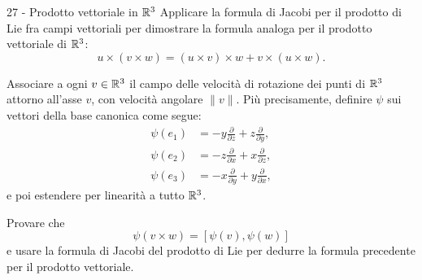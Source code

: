 \documentclass[a4paper]{article}
\begin{document}
\begin{snippetexercise}{27 - Prodotto vettoriale in \(\mathbb{R}^3\)}
    Applicare la formula di Jacobi per il prodotto di Lie fra campi
    vettoriali per dimostrare la formula analoga per il prodotto
    vettoriale di \(\mathbb{R}^3\):
    \[
        u\times(v\times w)
        =
        (u\times v)\times w+v\times(u\times w).
    \]

    Associare a ogni \(v\in\mathbb{R}^3\) il campo delle velocità di
    rotazione dei punti di \(\mathbb{R}^3\) attorno all'asse \(v\),
    con velocità angolare \(\|v\|\). Più precisamente, definire
    \(\psi\) sui vettori della base canonica come segue:
    \begin{align*}
        \psi(e_1)
        &=
        -y\frac{\partial}{\partial z}
        +z\frac{\partial}{\partial y},\\
        \psi(e_2)
        &=
        -z\frac{\partial}{\partial x}
        +x\frac{\partial}{\partial z},\\
        \psi(e_3)
        &=
        -x\frac{\partial}{\partial y}
        +y\frac{\partial}{\partial x},
    \end{align*}
    e poi estendere per linearità a tutto \(\mathbb{R}^3\).

    Provare che
    \[
        \psi(v\times w)=[\psi(v),\psi(w)]
    \]
    e usare la formula di Jacobi del prodotto di Lie per dedurre la
    formula precedente per il prodotto vettoriale.
\end{snippetexercise}
\end{document}
